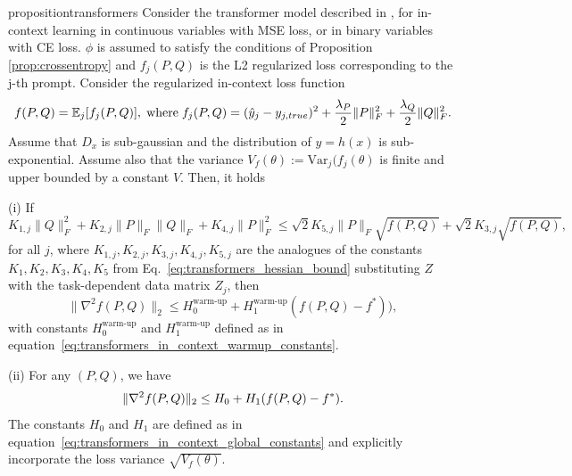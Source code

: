 \documentclass[a4paper,11pt]{article}
\DeclarePairedDelimiter{\norm}{\|}{\|}
\newcommand{\1}{\mathbbm{1}}
\theoremstyle{plain}
\begin{document}
\begin{restatable}{proposition}{transformers}
\label{prop:transformers_in_context_formal}
Consider the transformer model described in , for in-context learning in continuous variables with MSE loss, or in binary variables with CE loss. $\phi$ is assumed to satisfy the conditions of Proposition \ref{prop:crossentropy}  and $f_j(P,Q)$ is the L2 regularized loss corresponding to the j-th prompt.  Consider the regularized in-context loss function
   \begin{equation*}
        f(P,Q) = \mathbb{E}_j[f_j(P,Q)], \hspace{1mm} \text{where} \hspace{1mm} f_j(P,Q)=(\hat{y}_j - y_{j,true})^2 + \frac{\lambda_P}{2} \|P\|_F^2 + \frac{\lambda_Q}{2} \|Q\|_F^2.
    \end{equation*}
    Assume that $D_x$ is sub-gaussian and the distribution of $y=h(x)$ is sub-exponential. Assume also that the variance $V_f(\theta):= \text{Var}_j(f_j(\theta)$ is finite and upper bounded by a constant $V$. Then, it holds
    
(i) If $$K_{1,j} \|Q\|_F^2 + K_{2,j} \|P\|_F \|Q\|_F + K_{4,j} \|P\|_F^2 \leq \sqrt{2} K_{5,j} \|P\|_F \sqrt{f(P,Q)} + \sqrt{2} K_{3,j} \sqrt{f(P,Q)},$$ for all $j$, where $K_{1,j},K_{2,j},K_{3,j},K_{4,j},K_{5,j}$ are the analogues of the constants $K_1,K_2,K_3,K_4,K_5$ from Eq.~\eqref{eq:transformers_hessian_bound} substituting $Z$ with the task-dependent data matrix $Z_j$,
then
\begin{equation*}
    \|\nabla^2 f(P,Q)\|_2 \leq %
    H_0^{\text{warm-up}}+H_1^{\text{warm-up}} (f(P,Q)-f^*)),
\end{equation*}
with constants $H_0^{\text{warm-up}}$ and $H_1^{\text{warm-up}}$ defined as in equation~\eqref{eq:transformers_in_context_warmup_constants}.

(ii) For any $(P,Q)$, we have
\begin{equation*}
    \norm{\nabla^2 f(P,Q)}_2 \le H_0 + H_1 (f(P,Q) - f^*).
\end{equation*}
The constants $H_0$ and $H_1$ are defined as in equation~\eqref{eq:transformers_in_context_global_constants} and explicitly incorporate the loss variance $\sqrt{V_f(\theta)}$.

\end{restatable}
\end{document}
